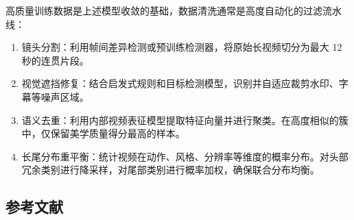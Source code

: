 高质量训练数据是上述模型收敛的基础，数据清洗通常是高度自动化的过滤流水线：

\begin{enumerate}
\def\labelenumi{\arabic{enumi}.}
\item
  镜头分割：利用帧间差异检测或预训练检测器，将原始长视频切分为最大 12 秒的连贯片段。
\item
  视觉遮挡修复：结合启发式规则和目标检测模型，识别并自适应裁剪水印、字幕等噪声区域。
\item
  语义去重：利用内部视频表征模型提取特征向量并进行聚类。在高度相似的簇中，仅保留美学质量得分最高的样本。
\item
  长尾分布重平衡：统计视频在动作、风格、分辨率等维度的概率分布。对头部冗余类别进行降采样，对尾部类别进行概率加权，确保联合分布均衡。
\end{enumerate}

\FloatBarrier
{}
\hypertarget{ux53c2ux8003ux6587ux732e-139}{%
\subsection{参考文献}\label{ux53c2ux8003ux6587ux732e-139}}

